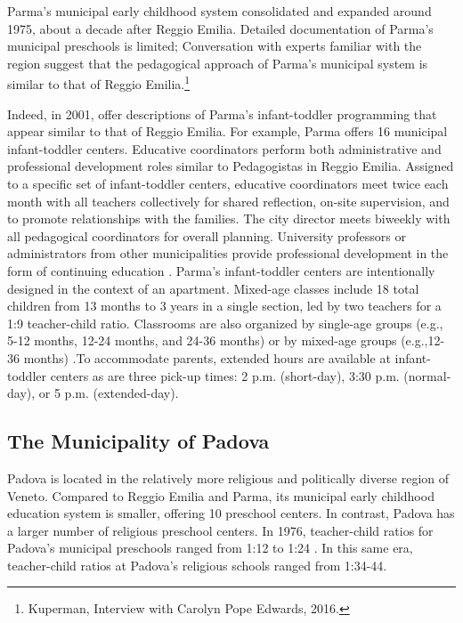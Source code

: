 Parma's municipal early childhood system consolidated and expanded around 1975, about a decade after Reggio Emilia. Detailed documentation of Parma's municipal preschools is limited; Conversation with experts familiar with the region suggest that the pedagogical approach of Parma's municipal system is similar to that of Reggio Emilia.\footnote{Kuperman, Interview with Carolyn Pope Edwards, 2016.} 

Indeed, in 2001,\citet{Terzi-Cantarelli_2001_Parma} offer descriptions of Parma's infant-toddler programming that appear similar to that of Reggio Emilia. For example, Parma offers 16 municipal infant-toddler centers. Educative coordinators perform both administrative and professional development roles similar to Pedagogistas in Reggio Emilia. Assigned to a specific set of infant-toddler centers, educative coordinators meet twice each month with all teachers collectively for shared reflection, on-site supervision, and to promote relationships with the families. The city director meets biweekly with all pedagogical coordinators for overall planning. University professors or administrators from other municipalities provide professional development in the form of continuing education \citep{Terzi-Cantarelli_2001_Parma}. Parma's infant-toddler centers are intentionally designed in the context of an apartment. Mixed-age classes include 18 total children from 13 months to 3 years in a single section, led by two teachers  for a 1:9 teacher-child ratio. Classrooms are also organized by single-age groups (e.g., 5-12 months, 12-24 months, and 24-36 months) or by mixed-age groups (e.g.,12-36 months) \citep{Majorano-etal_2009_CC-in-P}.To accommodate parents, extended hours are available at infant-toddler centers as are three pick-up times: 2 p.m. (short-day), 3:30 p.m. (normal-day), or 5 p.m. (extended-day). 

\subsection{The Municipality of Padova}

Padova is located in the relatively more religious and politically diverse region of Veneto. Compared to Reggio Emilia and Parma, its municipal early childhood education system is smaller, offering 10 preschool centers. In contrast, Padova has a larger number of religious preschool centers. In 1976, teacher-child ratios for Padova's municipal preschools ranged from 1:12 to 1:24 \citep{Padova-Admin-Data_1964-2011,CEHD_2016_Historical-Analysis}. In this same era, teacher-child ratios at Padova's religious schools ranged from 1:34-44.

